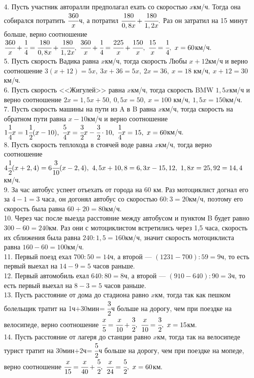 \documentclass[12pt]{article}
\begin{document}
4. Пусть участник авторалли предполагал ехать со скоростью $x$км/ч. Тогда она собирался потратить $\cfrac{360}{x}$ч, а потратил $\cfrac{180}{0,8x}+\cfrac{180}{1,2x}.$ Раз он затратил на 15 минут больше, верно соотношение $\cfrac{360}{x}+\cfrac{1}{4}=\cfrac{180}{0,8x}+\cfrac{180}{1,2x},\ \cfrac{360}{x}+\cfrac{1}{4}=\cfrac{225}{x}+\cfrac{150}{x},\ \cfrac{15}{x}=\cfrac{1}{4},\ x=60$км/ч.\\
5. Пусть скорость Вадика равна $x$км/ч, тогда скорость Любы $x+12$км/ч и верно соотношение $3(x+12)=5x,\ 3x+36=5x,\ 2x=36,\ x=18\text{ км/ч},\ x+12=30$км/ч.\\
6. Пусть скорость <<Жигулей>> равна $x$км/ч, тогда скорость BMW $1,5x$км/ч и верно соотношение $2x=1,5x+50,\ 0,5x=50,\ x=100\text{ км/ч},\ 1,5x=150$км/ч.\\
7. Пусть скорость машины на пути из A в B равна $x$км/ч, тогда скорость на обратном пути равна $x-10$км/ч и верно соотношение $1\cfrac{1}{4}x=1\cfrac{1}{2}(x-10),\
\cfrac{5}{4}x=\cfrac{3}{2}x-\cfrac{3}{2}\cdot10,\ \cfrac{1}{4}x=15,\ x=60$км/ч.\\
8. Пусть скорость теплохода в стоячей воде равна $x$км/ч, тогда верно соотношение $4\cfrac{1}{2}(x+2,4)=6\cfrac{3}{10}(x-2,4),\ 4,5x+10,8=6,3x-15,12,\
1,8x=25,92=14,4$км/ч.\\
9. За час автобус успеет отъехать от города на 60 км. Раз мотоциклист догнал его за $4-1=3$ часа, он догонял автобус со скоростью $60:3=20$км/ч, поэтому его скорость была равна $60+20=80$км/ч.\\
10. Через час после выезда расстояние между автобусом и пунктом B будет равно $300-60=240$км. Раз они с мотоциклистом встретились через 1,5 часа, скорость их сближения была равна $240:1,5=160$км/ч, значит скорость мотоциклиста равна $160-60=100$км/ч.\\
11. Первый поезд ехал $700:50=14$ч, а второй --- $(1231-700):59=9$ч, то есть первый выехал на $14-9=5$ часов раньше.\\
12. Первый автомобиль ехал $640:80=8$ч, а второй --- $(910-640):90=3$ч, то есть первый выехал на $8-3=5$ часов раньше.\\
13. Пусть расстояние от дома до стадиона равно $x$км, тогда так как пешком болельщик тратит на 1ч$+$30мин$=\cfrac{3}{2}$ч больше на дорогу, чем при поездке на велосипеде, верно соотношение $\cfrac{x}{5}=\cfrac{x}{10}+\cfrac{3}{2},\ \cfrac{x}{10}=\cfrac{3}{2},\ x=15$км.\\
14. Пусть расстояние от лагеря до станции равно $x$км, тогда так на велосипеде турист тратит на 30мин$+2$ч$=\cfrac{5}{2}$ч больше на дорогу, чем при поездке на мопеде, верно соотношение $\cfrac{x}{15}=\cfrac{x}{40}+\cfrac{5}{2},\ \cfrac{x}{24}=\cfrac{5}{2},\ x=60$км.\\
\end{document}
